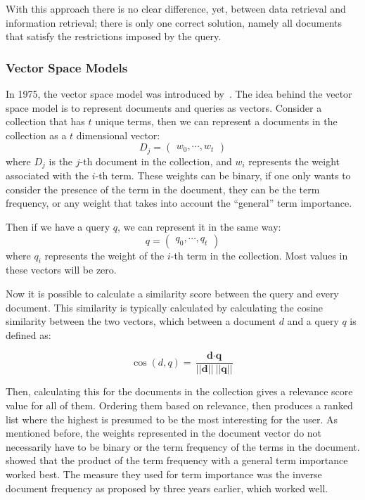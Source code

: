 With this approach there is no clear difference, yet, between data retrieval and information retrieval; there is only one correct solution, namely all documents that satisfy the restrictions imposed by the query. 

\subsubsection{Vector Space Models}
In 1975, the vector space model was introduced by~\citet{VectorSpaceModel}. The idea behind the vector space model is to represent documents and queries as vectors. Consider a collection that has $t$ unique terms, then we can represent a documents in the collection as a $t$ dimensional vector:
\begin{equation}
	D_j = \begin{pmatrix}
		w_0, \cdots, w_t
	\end{pmatrix}
\end{equation}
where $D_j$ is the $j$-th document in the collection, and $w_i$ represents the weight associated with the $i$-th term. These weights can be binary, if one only wants to consider the presence of the term in the document, they can be the term frequency, or any weight that takes into account the ``general'' term importance. 

Then if we have a query $q$, we can represent it in the same way:
\begin{equation}
	q = \begin{pmatrix}
		q_0, \cdots, q_t
	\end{pmatrix}
\end{equation}
where $q_i$ represents the weight of the $i$-th term in the collection. Most values in these vectors will be zero.

Now it is possible to calculate a similarity score between the query and every document. This similarity is typically calculated by calculating the cosine similarity between the two vectors, which between a document $d$ and a query $q$ is defined as:

\begin{equation}
	\cos\left(d, q\right) = \frac{\textbf{d} \cdot \textbf{q}}{||\textbf{d}||\ ||\textbf{q}||}
\end{equation}

Then, calculating this for the documents in the collection gives a relevance score value for all of them. Ordering them based on relevance, then produces a ranked list where the highest is presumed to be the most interesting for the user. As mentioned before, the weights represented in the document vector do not necessarily have to be binary or the term frequency of the terms in the document.  showed that the product of the term frequency with a general term importance worked best. The measure they used for term importance was the inverse document frequency as proposed by \citet{idf} three years earlier, which worked well. 

